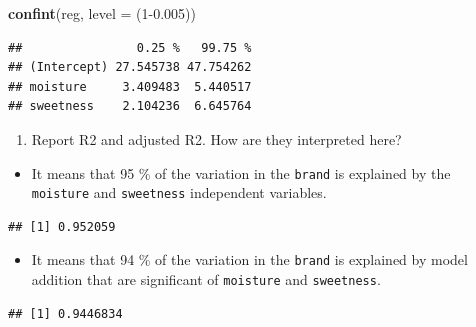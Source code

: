 \documentclass[
]{article}
\newenvironment{Shaded}{\begin{snugshade}}{\end{snugshade}}
\newcommand{\DataTypeTok}[1]{\textcolor[rgb]{0.13,0.29,0.53}{#1}}
\newcommand{\DecValTok}[1]{\textcolor[rgb]{0.00,0.00,0.81}{#1}}
\newcommand{\FloatTok}[1]{\textcolor[rgb]{0.00,0.00,0.81}{#1}}
\newcommand{\KeywordTok}[1]{\textcolor[rgb]{0.13,0.29,0.53}{\textbf{#1}}}
\newcommand{\NormalTok}[1]{#1}
\newcommand{\OperatorTok}[1]{\textcolor[rgb]{0.81,0.36,0.00}{\textbf{#1}}}
\providecommand{\tightlist}{%
  \setlength{\itemsep}{0pt}\setlength{\parskip}{0pt}}
\begin{document}
\begin{Shaded}
\begin{Highlighting}[]
\KeywordTok{confint}\NormalTok{(reg, }\DataTypeTok{level =}\NormalTok{ (}\DecValTok{1}\FloatTok{-0.005}\NormalTok{))}
\end{Highlighting}
\end{Shaded}

\begin{verbatim}
##                0.25 %   99.75 %
## (Intercept) 27.545738 47.754262
## moisture     3.409483  5.440517
## sweetness    2.104236  6.645764
\end{verbatim}

\begin{enumerate}
\def\labelenumi{(\alph{enumi})}
\setcounter{enumi}{6}
\tightlist
\item
  Report R2 and adjusted R2. How are they interpreted here?
\end{enumerate}

\begin{itemize}
\tightlist
\item
  It means that 95 \% of the variation in the \texttt{brand} is
  explained by the \texttt{moisture} and \texttt{sweetness} independent
  variables.
\end{itemize}

\begin{Shaded}
\end{Shaded}

\begin{verbatim}
## [1] 0.952059
\end{verbatim}

\begin{itemize}
\tightlist
\item
  It means that 94 \% of the variation in the \texttt{brand} is
  explained by model addition that are significant of \texttt{moisture}
  and \texttt{sweetness}.
\end{itemize}

\begin{Shaded}
\end{Shaded}

\begin{verbatim}
## [1] 0.9446834
\end{verbatim}
\end{document}
